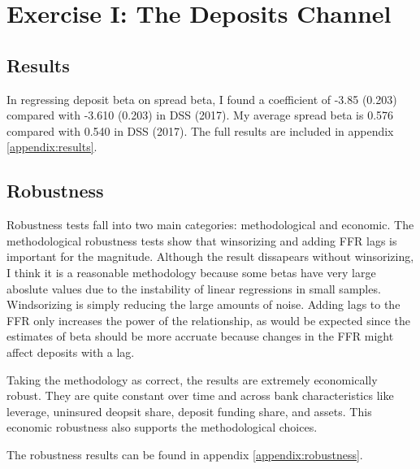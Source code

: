 \documentclass[11pt]{article}
\begin{document}
\section{Exercise I: The Deposits Channel}

\subsection{Results}

In regressing deposit beta on spread beta, I found a coefficient of -3.85 (0.203) compared with -3.610 (0.203) in DSS (2017). My average spread beta is 0.576 compared with 0.540 in DSS (2017). The full results are included in appendix \ref{appendix:results}.

\subsection{Robustness}

Robustness tests fall into two main categories: methodological and economic. The methodological robustness tests show that winsorizing and adding FFR lags is important for the magnitude. Although the result dissapears without winsorizing, I think it is a reasonable methodology because some betas have very large aboslute values due to the instability of linear regressions in small samples. Windsorizing is simply reducing the large amounts of noise. Adding lags to the FFR only increases the power of the relationship, as would be expected since the estimates of beta should be more accruate because changes in the FFR might affect deposits with a lag.

Taking the methodology as correct, the results are extremely economically robust. They are quite constant over time and across bank characteristics like leverage, uninsured deopsit share, deposit funding share, and assets. This economic robustness also supports the methodological choices.

The robustness results can be found in appendix \ref{appendix:robustness}.
\end{document}
